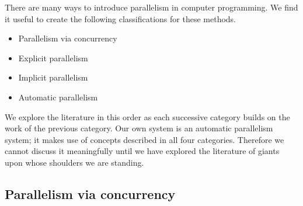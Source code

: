 There are many ways to introduce parallelism in computer programming.
We find it useful to create the following classifications for these methods.
\begin{itemize}
    \item Parallelism via concurrency

    \item Explicit parallelism

    \item Implicit parallelism

    \item Automatic parallelism

\end{itemize}
We explore the literature in this order as each successive category builds
on the work of the previous category.
Our own system is an automatic parallelism system;
it makes use of concepts described in all four categories.
Therefore
we cannot discuss it meaningfully until we have explored the literature
of giants upon whose shoulders we are standing.


\subsection{Parallelism via concurrency}
\label{sec:intro_concurrency}

